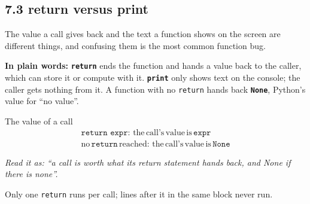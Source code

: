 \documentclass[11pt]{article}
\begin{document}
\begin{keepsection}
\section{7.3 return versus print}

The value a call gives back and the text a function shows on the screen are different things, and confusing them is the most common function bug.

\begin{plainbox}\textbf{In plain words:} \textbf{\texttt{return}} ends the function and hands a value back to the caller, which can store it or compute with it. \textbf{\texttt{print}} only shows text on the console; the caller gets nothing from it. A function with no \texttt{return} hands back \textbf{\texttt{None}}, Python’s value for “no value”.\end{plainbox}

\begin{equationcard}{The value of a call}
\[ \begin{gathered} \texttt{return expr}:\, \text{the}\, \text{call}’\mathrm{s}\, \text{value}\, \text{is}\, \texttt{expr} \\ \text{no}\, \texttt{return}\, \text{reached}:\, \text{the}\, \text{call}’\mathrm{s}\, \text{value}\, \text{is}\, \texttt{None} \end{gathered} \]
{\small \emph{Read it as: “a call is worth what its return statement hands back, and None if there is none”.}\par  Only one \texttt{return} runs per call; lines after it in the same block never run.}
\end{equationcard}


\end{keepsection}
\end{document}
